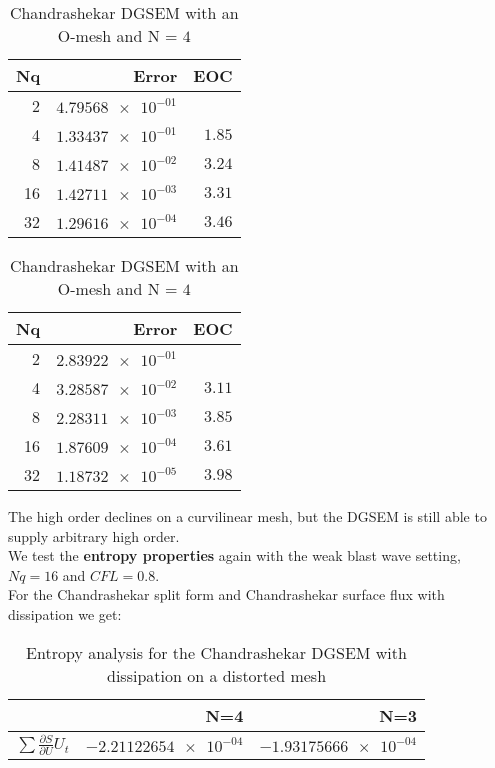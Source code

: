 \documentclass[11pt]{scrartcl}
\begin{document}
\begin{table}[H]
\parbox{.45\linewidth}{
\centering
    \begin{tabular}{|r|r|r|}
    \hline\hline
    \textbf{Nq} & \textbf{Error} & \textbf{EOC} \\\hline
    2 & $\num{4.79568e-01}$ &  \\
    4 & $\num{1.33437e-01}$ & $\num{1.85}$ \\
    8 & $\num{1.41487e-02}$ & $\num{3.24}$ \\
    16 & $\num{1.42711e-03}$ & $\num{3.31}$ \\
    32 & $\num{1.29616e-04}$ & $\num{3.46}$ \\\hline\hline
  \end{tabular} 
  \caption{Chandrashekar DGSEM with an O-mesh and N = $3$}
  }
  \hspace{0.5cm}
  \parbox{.45\linewidth}{
	\centering
    \begin{tabular}{|r|r|r|}
    \hline\hline
    \textbf{Nq} & \textbf{Error} & \textbf{EOC} \\\hline
    2 & $\num{2.83922e-01}$ &  \\
    4 & $\num{3.28587e-02}$ & $\num{3.11}$ \\
    8 & $\num{2.28311e-03}$ & $\num{3.85}$ \\
    16 & $\num{1.87609e-04}$ & $\num{3.61}$ \\
    32 & $\num{1.18732e-05}$ & $\num{3.98}$ \\\hline\hline
  \end{tabular}
   \caption{Chandrashekar DGSEM with an O-mesh and N = $4$}
  }
\end{table}
The high order declines on a curvilinear mesh, but the DGSEM is still able to supply arbitrary high order. \\
We test the \textbf{entropy properties} again with the weak blast wave setting, $Nq = 16$ and $CFL=0.8$.\\
For the Chandrashekar split form and Chandrashekar surface flux with dissipation we get: \\
\begin{table}[H]
\centering
\begin{tabular}{|r|r|r|}
    \hline\hline
     & \textbf{N=4} & \textbf{N=3} \\\hline
    $\sum \frac{\partial S}{\partial U} U_t$ & $\num{-2.21122654e-04}$ & $\num{-1.93175666e-04}$ \\\hline\hline
\end{tabular}
\caption{Entropy analysis for the Chandrashekar DGSEM with dissipation on a distorted mesh}
\end{table}
\end{document}
